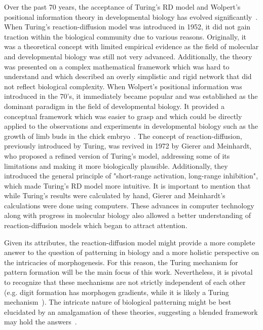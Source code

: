 Over the past 70 years, the acceptance of Turing's \acrfull{RD} model and Wolpert's positional information theory in developmental biology has evolved significantly~\parencite{green2015positional}.
When Turing's reaction-diffusion model was introduced in 1952, it did not gain traction within the biological community due to various reasons.
Originally, it was a theoretical concept with limited empirical evidence as the field of molecular and developmental biology was still not very advanced.
Additionally, the theory was presented on a complex mathematical framework which was hard to understand and which described an overly simplistic and rigid network that did not reflect biological complexity.
When Wolpert's positional information was introduced in the 70's, it immediately became popular and was established as the dominant paradigm in the field of developmental biology.
It provided a conceptual framework which was easier to grasp and which could be directly applied to the observations and experiments in developmental biology such as the growth of limb buds in the chick embryo~\parencite{saunders1968ectodermal}.
The concept of reaction-diffusion, previously introduced by Turing, was revived in 1972 by Gierer and Meinhardt, who proposed a refined version of Turing's model, addressing some of its limitations and making it more biologically plausible.
Additionally, they introduced the general principle of "short-range activation, long-range inhibition", which made Turing's RD model more intuitive.
It is important to mention that while Turing's results were calculated by hand, Gierer and Meinhardt's calculations were done using computers.
These advances in computer technology along with progress in molecular biology also allowed a better understanding of reaction-diffusion models which began to attract attention.

Given its attributes, the reaction-diffusion model might provide a more complete answer to the question of patterning in biology and a more holistic perspective on the intricacies of morphogenesis.
For this reason, the Turing mechanism for pattern formation will be the main focus of this work.
Nevertheless, it is pivotal to recognize that these mechanisms are not strictly independent of each other (e.g. digit formation has morphogen gradients, while it is likely a Turing mechanism~\parencite{Raspopovic1}).
The intricate nature of biological patterning might be best elucidated by an amalgamation of these theories, suggesting a blended framework may hold the answers~\parencite{Green2015}.

